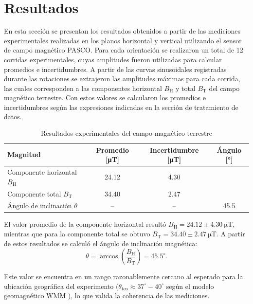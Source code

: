 \documentclass[12pt,a4paper]{article}
\begin{document}
\section{Resultados}

En esta sección se presentan los resultados obtenidos a partir de las mediciones experimentales realizadas en los planos horizontal y vertical utilizando el sensor de campo magnético PASCO. Para cada orientación se realizaron un total de 12 corridas experimentales, cuyas amplitudes fueron utilizadas para calcular promedios e incertidumbres. A partir de las curvas sinusoidales registradas durante las rotaciones se extrajeron las amplitudes máximas para cada corrida, las cuales corresponden a las componentes horizontal \( B_\mathrm{H} \) y total \( B_\mathrm{T} \) del campo magnético terrestre. Con estos valores se calcularon los promedios e incertidumbres según las expresiones indicadas en la sección de tratamiento de datos.

\begin{table}[H]
\centering
\caption{Resultados experimentales del campo magnético terrestre}
\begin{tabular}{lccc}
\toprule
\textbf{Magnitud} & \textbf{Promedio [\si{\micro\tesla}]} & \textbf{Incertidumbre [\si{\micro\tesla}]} & \textbf{Ángulo [\si{\degree}]} \\
\midrule
Componente horizontal \( B_\mathrm{H} \) & 24.12 & 4.30 & \\
Componente total \( B_\mathrm{T} \) & 34.40 & 2.47 & \\
Ángulo de inclinación \( \theta \) & -- & -- & 45.5 \\
\bottomrule
\end{tabular}
\end{table}

El valor promedio de la componente horizontal resultó \( B_\mathrm{H} = 24.12 \pm 4.30~\si{\micro\tesla} \), mientras que para la componente total se obtuvo \( B_\mathrm{T} = 34.40 \pm 2.47~\si{\micro\tesla} \). A partir de estos resultados se calculó el ángulo de inclinación magnética:
\[
\theta = \arccos\left(\frac{B_\mathrm{H}}{B_\mathrm{T}}\right) = 45.5^\circ.
\]

Este valor se encuentra en un rango razonablemente cercano al esperado para la ubicación geográfica del experimento (\( \theta_\mathrm{teo} \approx 37^\circ - 40^\circ \) según el modelo geomagnético WMM \cite{geomag}), lo que valida la coherencia de las mediciones.
\end{document}
